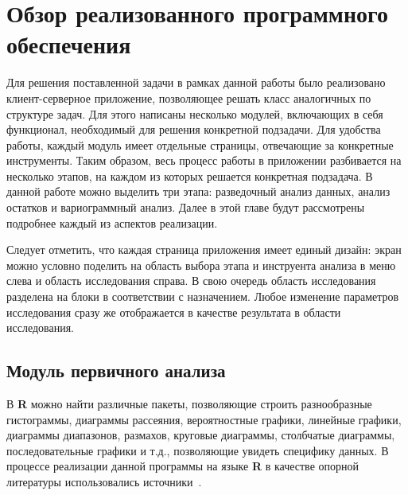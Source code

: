 
\newpage

\chapter{Обзор реализованного программного обеспечения}
\label{c:implementation}

Для решения поставленной задачи в рамках данной работы было реализовано клиент-серверное приложение, позволяющее решать класс аналогичных по структуре задач. Для этого написаны несколько модулей, включающих в себя функционал, необходимый для решения конкретной подзадачи. Для удобства работы, каждый модуль имеет отдельные страницы, отвечающие за конкретные инструменты. Таким образом, весь процесс работы в приложении разбивается на несколько этапов, на каждом из которых решается конкретная подзадача. В данной работе можно выделить три этапа: разведочный анализ данных, анализ остатков и вариограммный анализ. Далее в этой главе будут рассмотрены подробнее каждый из аспектов реализации.

Следует отметить, что каждая страница приложения имеет единый дизайн: экран можно условно поделить на область выбора этапа и инструента анализа в меню слева и область исследования справа. В свою очередь область исследования разделена на блоки в соответствии с назначением. Любое изменение параметров исследования сразу же отображается в качестве результата в области исследования.

\section{Модуль первичного анализа} %
\label{sec:mod_basis}

В \textbf{R} можно найти различные пакеты, позволяющие строить разнообразные гистограммы, диаграммы рассеяния, вероятностные графики, линейные графики, диаграммы диапазонов, размахов, круговые диаграммы, столбчатые диаграммы, последовательные графики и т.д., позволяющие увидеть специфику данных. В процессе реализации данной программы на языке \textbf{R} в качестве опорной литературы использовались источники~\cite{Kabacoff2009R, Teetor2011RCook, Chang2012RGraph}.

